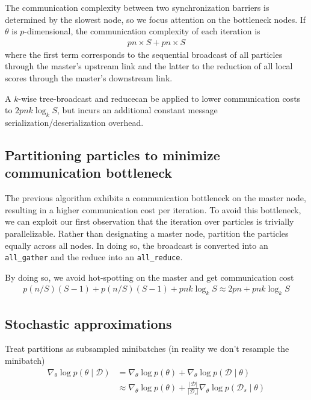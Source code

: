 \documentclass{article}
\newcommand{\cD}{\mathcal{D}}
\begin{document}
The communication complexity between two synchronization barriers is determined
by the slowest node, so we focus attention on the bottleneck nodes.
If $\theta$ is $p$-dimensional, the communication complexity of each iteration is
\begin{align}
    p n \times S + p n \times S
\end{align}
where the first term corresponds to the sequential broadcast of all particles through
the master's upstream link and the latter to the reduction of all local scores through
the master's downstream link.

A $k$-wise tree-broadcast and reducecan be applied to lower communication costs
to $2 p n k \log_k S$, but incurs an additional constant message
serialization/deserialization overhead.

\subsection{Partitioning particles to minimize communication bottleneck}
\label{sub:partitioning_particles_to_minimize_communication_bottleneck}

The previous algorithm exhibits a communication bottleneck on the master node,
resulting in a higher communication cost per iteration. To avoid this
bottleneck, we can exploit our first observation that the iteration over particles
is trivially parallelizable. Rather than designating a master node,
partition the particles equally across all nodes.
In doing so, the broadcast is converted into an \texttt{all\_gather} and
the reduce into an \texttt{all\_reduce}.

By doing so, we avoid hot-spotting on the master and get communication cost
\begin{align}
    p (n/S) (S-1) + p (n/S) (S-1) + p n k \log_k S
    \approx 2 p n + p n k \log_k S
\end{align}

\subsection{Stochastic approximations}%
\label{sub:stochastic_approxmations}

Treat partitions as subsampled minibatches (in reality we don't resample the minibatch)
\begin{align}
    \nabla_\theta \log p(\theta \mid \cD)
    &= \nabla_\theta \log p(\theta) + \nabla_\theta \log p(\cD \mid \theta) \\
    &\approx \nabla_\theta \log p(\theta) + \frac{\lvert \cD \rvert}{\lvert \cD_s \rvert} \nabla_\theta \log p(\cD_s \mid \theta)
\end{align}
\end{document}
